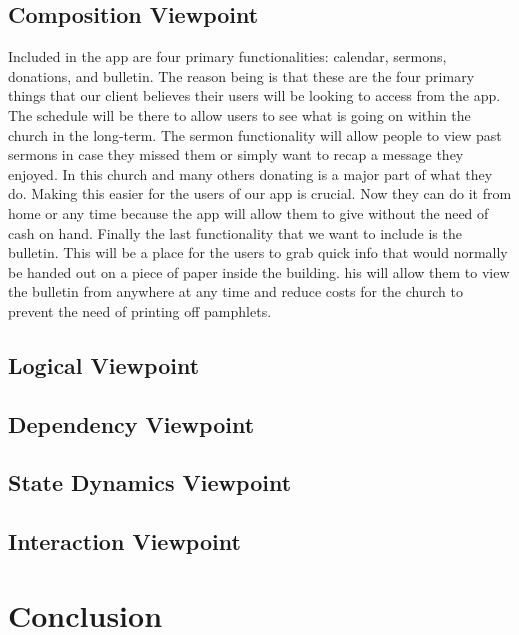 \documentclass[letterpaper,10pt,draftclsnofoot,onecolumn,titlepage]{IEEEtran}
\begin{document}
		\subsection{Composition Viewpoint}
		Included in the app are four primary functionalities: calendar, sermons, donations, and bulletin. 
		The reason being is that these are the four primary things that our client believes their users will be looking to access from the app. 
		The schedule will be there to allow users to see what is going on within the church in the long-term. 
		The sermon functionality will allow people to view past sermons in case they missed them or simply want to recap a message they enjoyed. 
		In this church and many others donating is a major part of what they do. 
		Making this easier for the users of our app is crucial. 
		Now they can do it from home or any time because the app will allow them to give without the need of cash on hand. 
		Finally the last functionality that we want to include is the bulletin. 
		This will be a place for the users to grab quick info that would normally be handed out on a piece of paper inside the building. 
		his will allow them to view the bulletin from anywhere at any time and reduce costs for the church to prevent the need of printing off pamphlets. 
		\subsection{Logical Viewpoint}
		
		\subsection{Dependency Viewpoint}
		
		\subsection{State Dynamics Viewpoint}
		
		\subsection{Interaction Viewpoint}
		
	\section{Conclusion}
	
	
\end{document}
